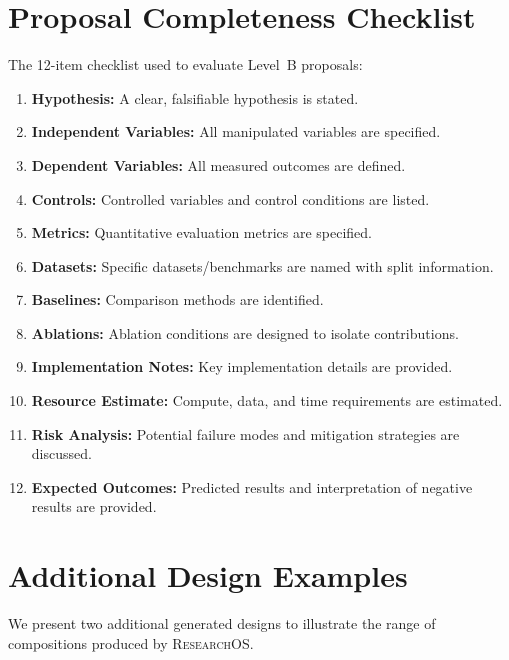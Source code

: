 \section{Proposal Completeness Checklist}
\label{app:checklist}

The 12-item checklist used to evaluate Level~B proposals:

\begin{enumerate}[leftmargin=*]
\item \textbf{Hypothesis:} A clear, falsifiable hypothesis is stated.
\item \textbf{Independent Variables:} All manipulated variables are specified.
\item \textbf{Dependent Variables:} All measured outcomes are defined.
\item \textbf{Controls:} Controlled variables and control conditions are listed.
\item \textbf{Metrics:} Quantitative evaluation metrics are specified.
\item \textbf{Datasets:} Specific datasets/benchmarks are named with split information.
\item \textbf{Baselines:} Comparison methods are identified.
\item \textbf{Ablations:} Ablation conditions are designed to isolate contributions.
\item \textbf{Implementation Notes:} Key implementation details are provided.
\item \textbf{Resource Estimate:} Compute, data, and time requirements are estimated.
\item \textbf{Risk Analysis:} Potential failure modes and mitigation strategies are discussed.
\item \textbf{Expected Outcomes:} Predicted results and interpretation of negative results are provided.
\end{enumerate}

\section{Additional Design Examples}
\label{app:examples}

We present two additional generated designs to illustrate the range of compositions produced by \textsc{ResearchOS}.

